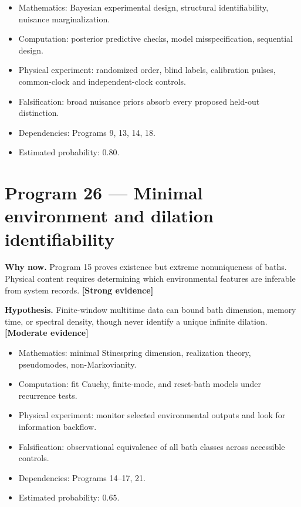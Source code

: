 \documentclass[11pt,a4paper,openany]{report}
\newcommand{\statusStrong}{\textcolor{finblue}{[Strong evidence]}}
\newcommand{\statusModerate}{\textcolor{finviolet}{[Moderate evidence]}}
\begin{document}
\begin{itemize}
\item 
Mathematics: Bayesian experimental design, structural identifiability, nuisance marginalization.

\item 
Computation: posterior predictive checks, model misspecification, sequential design.

\item 
Physical experiment: randomized order, blind labels, calibration pulses, common-clock and independent-clock controls.

\item 
Falsification: broad nuisance priors absorb every proposed held-out distinction.

\item 
Dependencies: Programs 9, 13, 14, 18.

\item 
Estimated probability: \(0.80\).

\end{itemize}

\section{Program 26 — Minimal environment and dilation identifiability}

\textbf{Why now.} Program 15 proves existence but extreme nonuniqueness of baths. Physical content requires determining which environmental features are inferable from system records. \textbf{\statusStrong{}}

\textbf{Hypothesis.} Finite-window multitime data can bound bath dimension, memory time, or spectral density, though never identify a unique infinite dilation. \textbf{\statusModerate{}}

\begin{itemize}
\item 
Mathematics: minimal Stinespring dimension, realization theory, pseudomodes, non-Markovianity.

\item 
Computation: fit Cauchy, finite-mode, and reset-bath models under recurrence tests.

\item 
Physical experiment: monitor selected environmental outputs and look for information backflow.

\item 
Falsification: observational equivalence of all bath classes across accessible controls.

\item 
Dependencies: Programs 14–17, 21.

\item 
Estimated probability: \(0.65\).

\end{itemize}
\end{document}
